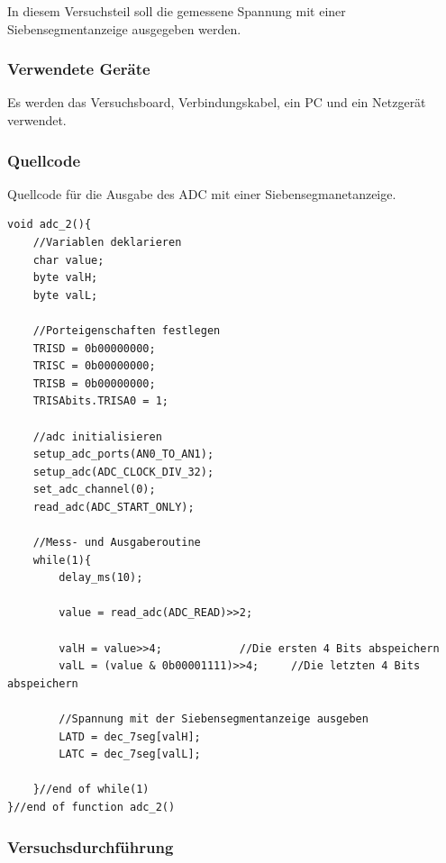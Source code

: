 \documentclass[12pt,a4paper]{article}
\begin{document}
In diesem Versuchsteil soll die gemessene Spannung mit einer Siebensegmentanzeige ausgegeben werden.

\subsubsection*{Verwendete Geräte}

Es werden das Versuchsboard, Verbindungskabel, ein PC und ein Netzgerät verwendet.

\subsubsection*{Quellcode}

Quellcode für die Ausgabe des ADC mit einer Siebensegmanetanzeige.

\lstset{language=C, basicstyle=\tiny}
\begin{lstlisting}[caption = {adc mit Siebensegmentanzeige}, label=lst:g_14,captionpos=b]
void adc_2(){
	//Variablen deklarieren
	char value;
	byte valH;
	byte valL;

	//Porteigenschaften festlegen
	TRISD = 0b00000000;
	TRISC = 0b00000000;
	TRISB = 0b00000000;
	TRISAbits.TRISA0 = 1;

	//adc initialisieren
	setup_adc_ports(AN0_TO_AN1);
	setup_adc(ADC_CLOCK_DIV_32);
	set_adc_channel(0);
	read_adc(ADC_START_ONLY);
	
	//Mess- und Ausgaberoutine
	while(1){
		delay_ms(10);
		
		value = read_adc(ADC_READ)>>2;
		
		valH = value>>4;			//Die ersten 4 Bits abspeichern
		valL = (value & 0b00001111)>>4;		//Die letzten 4 Bits abspeichern
		
		//Spannung mit der Siebensegmentanzeige ausgeben
		LATD = dec_7seg[valH];
		LATC = dec_7seg[valL];
		
	}//end of while(1)
}//end of function adc_2()
\end{lstlisting}

\subsubsection*{Versuchsdurchführung}
\end{document}
